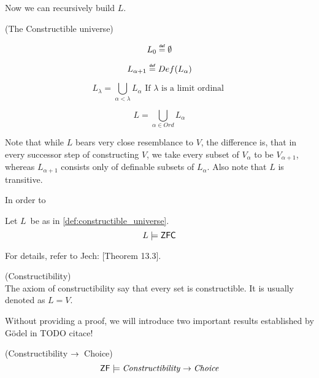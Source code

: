 Now we can recursively build $L$.
\begin{definition}{(The Constructible universe)}\label{def:constructible_universe}\\
\bce[(i)]
\item
\begin{equation}
L_0 \defeq  \emptyset
\end{equation}

\item
\begin{equation}
L_{\alpha+1} \defeq  Def(L_{\alpha})
\end{equation}
\item
\begin{equation}
L_{\lambda} = \bigcup_{\alpha < \lambda} L_{\alpha}\mbox{ If }\lambda\mbox{ is a~limit ordinal }
\end{equation}
\item
\begin{equation}\label{eq:def_l}
L = \bigcup_{\alpha\in Ord} L_{\alpha}
\end{equation}
\ece
\end{definition}

Note that while $L$ bears very close resemblance to $V$, the difference is, that in every successor step of constructing $V$, we take every subset of $V_\alpha$ to be $V_{\alpha+1}$, whereas $L_{\alpha+1}$ consists only of definable subsets of $L_\alpha$. Also note that $L$ is transitive.

In order to 

\begin{theorem}
Let $L$ be as in \ref{def:constructible_universe}.
\begin{equation}
L \models \sf{ZFC}
\end{equation}
\end{theorem}
For details, refer to Jech: \cite{JechBook}[Theorem 13.3].

\begin{definition}{(Constructibility)}\\
The axiom of constructibility say that every set is constructible. It is usually denoted as $L = V$.
\end{definition}

Without providing a proof, we will introduce two important results established by Gödel in TODO citace!

\begin{theorem}{(Constructibility $\rightarrow$ Choice)}
\begin{equation}
\sf{ZF} \models \mbox{\emph{Constructibility}} \rightarrow \mbox{\emph{Choice}} 
\end{equation}
\end{theorem}

